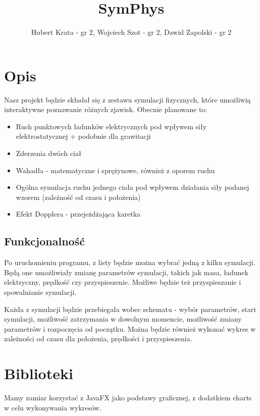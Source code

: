 \documentclass{article}
\title{SymPhys} %
\author{Hubert Krata - gr 2, Wojciech Szot - gr 2, Dawid Zapolski - gr 2}
\date{}
\begin{document}
\maketitle

\section{Opis}
Nasz projekt będzie składał się z zestawu symulacji fizycznych, które umożliwią interaktywne poznawanie różnych zjawisk. Obecnie planowane to:
\begin{itemize}
    \item Ruch punktowych ładunków elektrycznych pod wpływem siły elektrostatycznej + podobnie dla grawitacji
    \item Zderzenia dwóch ciał
    \item Wahadła - matematyczne i sprężynowe, również z oporem ruchu
    \item Ogólna symulacja ruchu jednego ciała pod wpływem działania siły podanej wzorem (zależność od czasu i położenia)
    \item Efekt Dopplera - przejeżdżająca karetka 

    
\end{itemize}

\subsection{Funkcjonalność}

Po uruchomieniu programu, z listy będzie można wybrać jedną z kilku symulacji.
Będą one umożliwiały zmianę parametrów symulacji, takich jak masa, ładunek elektryczny, prędkość czy przyspieszenie. Możliwe będzie też przyspieszanie i spowalnianie symulacji. 

Każda z symulacji będzie przebiegała wobec schematu - wybór parametrów, start symulacji, możliwość zatrzymania w dowolnym momencie, możliwość zmiany parametrów i rozpoczęcia od początku. 
Można będzie również wykonać wykres w zależności od czasu dla położenia, prędkości i przyspieszenia.



\section{Biblioteki}
Mamy zamiar korzystać z JavaFX jako podstawy graficznej, z dodatkiem charts w celu wykonywania wykresów.
\end{document}
